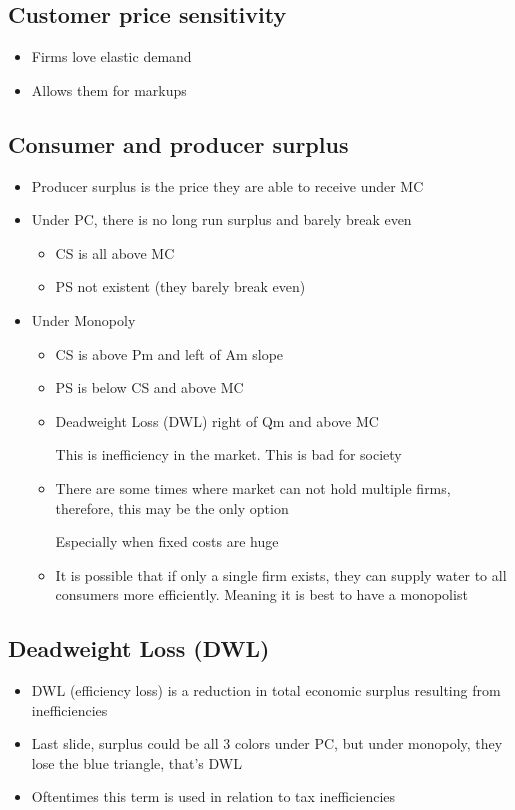 \documentclass{article}
\begin{document}
\subsection{Customer price sensitivity}
\begin{itemize}
  \item Firms love elastic demand
  \item Allows them for markups
\end{itemize}

\subsection{Consumer and producer surplus}
\begin{itemize}
  \item Producer surplus is the price they are able to receive under MC
  \item Under PC, there is no long run surplus and barely break even
    \begin{itemize}
      \item CS is all above MC
      \item PS not existent (they barely break even)
    \end{itemize}
  \item Under Monopoly
    \begin{itemize}
      \item CS is above Pm and left of Am slope
      \item PS is below CS and above MC
      \item Deadweight Loss (DWL) right of Qm and above MC

        This is inefficiency in the market. This is bad for society
      \item There are some times where market can not hold multiple firms,
        therefore, this may be the only option

        Especially when fixed costs are huge
      \item It is possible that if only a single firm exists, they can supply
        water to all consumers more efficiently. Meaning it is best to have
        a monopolist
    \end{itemize}
\end{itemize}

\subsection{Deadweight Loss (DWL)}
\begin{itemize}
  \item DWL (efficiency loss) is a reduction in total economic surplus resulting
    from inefficiencies
  \item Last slide, surplus could be all 3 colors under PC, but under monopoly, they
    lose the blue triangle, that's DWL
  \item Oftentimes this term is used in relation to tax inefficiencies
\end{itemize}
\end{document}
